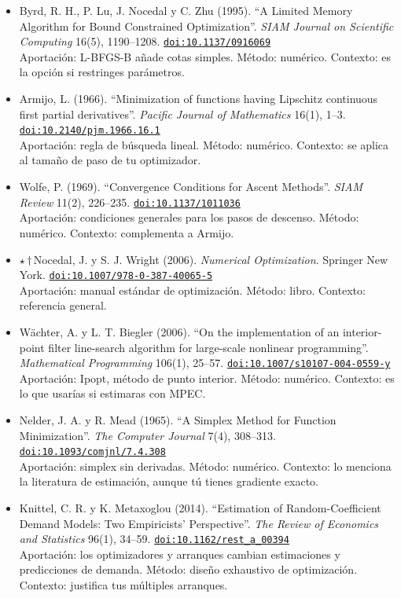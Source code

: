 \documentclass[11pt]{article}
\begin{document}
\begin{itemize}
Aportación: L-BFGS, el método de memoria limitada. Método: numérico. Contexto: es tu primera etapa de maximización.
\item Byrd, R. H., P. Lu, J. Nocedal y C. Zhu (1995). ``A Limited Memory Algorithm for Bound Constrained Optimization''. \textit{SIAM Journal on Scientific Computing} 16(5), 1190--1208. \href{https://doi.org/10.1137/0916069}{\texttt{doi:10.1137/0916069}}\\
Aportación: L-BFGS-B añade cotas simples. Método: numérico. Contexto: es la opción si restringes parámetros.
\item Armijo, L. (1966). ``Minimization of functions having Lipschitz continuous first partial derivatives''. \textit{Pacific Journal of Mathematics} 16(1), 1--3. \href{https://doi.org/10.2140/pjm.1966.16.1}{\texttt{doi:10.2140/pjm.1966.16.1}}\\
Aportación: regla de búsqueda lineal. Método: numérico. Contexto: se aplica al tamaño de paso de tu optimizador.
\item Wolfe, P. (1969). ``Convergence Conditions for Ascent Methods''. \textit{SIAM Review} 11(2), 226--235. \href{https://doi.org/10.1137/1011036}{\texttt{doi:10.1137/1011036}}\\
Aportación: condiciones generales para los pasos de descenso. Método: numérico. Contexto: complementa a Armijo.
\item $\star$\,$\dagger$\,Nocedal, J. y S. J. Wright (2006). \textit{Numerical Optimization}. Springer New York. \href{https://doi.org/10.1007/978-0-387-40065-5}{\texttt{doi:10.1007/978-0-387-40065-5}}\\
Aportación: manual estándar de optimización. Método: libro. Contexto: referencia general.
\item Wächter, A. y L. T. Biegler (2006). ``On the implementation of an interior-point filter line-search algorithm for large-scale nonlinear programming''. \textit{Mathematical Programming} 106(1), 25--57. \href{https://doi.org/10.1007/s10107-004-0559-y}{\texttt{doi:10.1007/s10107-004-0559-y}}\\
Aportación: Ipopt, método de punto interior. Método: numérico. Contexto: es lo que usarías si estimaras con MPEC.
\item Nelder, J. A. y R. Mead (1965). ``A Simplex Method for Function Minimization''. \textit{The Computer Journal} 7(4), 308--313. \href{https://doi.org/10.1093/comjnl/7.4.308}{\texttt{doi:10.1093/comjnl/7.4.308}}\\
Aportación: simplex sin derivadas. Método: numérico. Contexto: lo menciona la literatura de estimación, aunque tú tienes gradiente exacto.
\item Knittel, C. R. y K. Metaxoglou (2014). ``Estimation of Random-Coefficient Demand Models: Two Empiricists' Perspective''. \textit{The Review of Economics and Statistics} 96(1), 34--59. \href{https://doi.org/10.1162/rest\_a\_00394}{\texttt{doi:10.1162/rest\_a\_00394}}\\
Aportación: los optimizadores y arranques cambian estimaciones y predicciones de demanda. Método: diseño exhaustivo de optimización. Contexto: justifica tus múltiples arranques.
\end{itemize}
\end{document}

